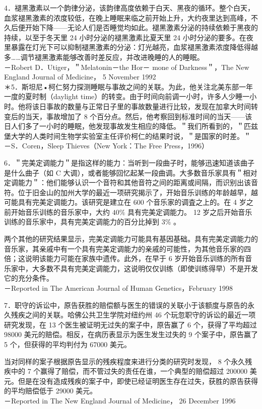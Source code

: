4．褪黑激素以一个韵律分泌，该韵律高度依赖于白天、黑夜的循环。整个白天，血浆褪黑激素的浓度较低，在晚上睡眠来临之前开始上升，大约夜里达到高峰，不久后便开始下降——无论人们是否睡觉均如此。褪黑激素分泌的持续依赖于黑夜的持续，以至于冬天里 24 小时分泌的褪黑激素比夏天里 24 小时分泌的要多。在夜里暴露在灯光下可以抑制褪黑激素的分泌：灯光越亮，血浆褪黑激素浓度降低得越多……调节褪黑激素能够改善时差反应，并改进晚睡的人的睡眠。\\
－Robert D．Utiger，＂Melatonin－the Hor－ mone of Darkness＂，The New England Journal of Medicine， 5 November 1992\\
＊5．斯坦尼•柯仁努力探测睡眠与事故之间的关联。为此，他关注北美东部一年一度的夏时制（daylight time）的转变。由于时间向前调一小时，许多人少睡一小时。他将该日事故的数量与正常日子里的事故数量进行比较，发现在加拿大时间转变后的当天，事故增加了 8 个百分点。然后，他考察回到标准时间的当天——该日人们多了一小时的睡眠，他发现事故发生相应的降低。＂我们所看到的，＂匹兹堡大学的人类时间生物学实验室主任评价柯仁的结果时说，＂是国家的时差。＂\\
－S．Coren，Sleep Thieves（New York：The Free Press，1996）

6．＂完美定调能力＂是指这样的能力：当听到一段曲子时，能够迅速知道该曲子是什么曲子（如 C 大调），或者能够回忆起某一段曲调。大多数音乐家具有＂相对定调能力＂：他们能够认识一个音符和其他音符之间的距离或间隔，而识别出该音符。位于旧金山的加州大学的最近一项研究揭示了，开始音乐训练的年龄越早，越可能具有完美定调能力。该研究是建立在 600 个音乐家的调査之上的。在 4 岁之前开始音乐训练的音乐家中，大约 $40 \%$ 具有完美定调能力。 12 岁之后开始音乐训练的音乐家中，具有完美定调能力的百分比掉到 $3 \%$ 。

两个其他的研究结果显示，完美定调能力可能具有基因基础。具有完美定调能力的音乐家，其亲戚中有一个具有完美定调能力的亲戚的可能性，为其他音乐家的四倍；这说明该能力可能在家族中遗传。此外，在早于 6 岁开始音乐训练的所有音乐家中，大多数不具有完美定调能力，这说明仅仅训练（即使训练得早）不是开发它的充分条件。\\
－Reported in The American Journal of Human Genetics，February 1998

7．职守的诉讼中，原告获胜的赔偿额与医生的错误的关联小于该额度与原告的永久残疾之间的关联。哈佛公共卫生学院对纽约州 46 个玩忽职守的诉讼的最近一项研究发现，在 13 个医生被证明无过失的案子中，原告赢了 6 个，获得了平均超过 98000 美元的赔偿。相反，在病历表显示为医生发生过失的 9 个案子中，原告赢了 5 个，但获得的平均判付为 67000 美元。

当对同样的案子根据原告显示的残疾程度来进行分类的研究时发现， 8 个永久残疾中的 7 个赢得了赔偿，而不管过失的责任在谁，一个典型的赔偿超过 200000 美元。但是在没有造成残疾的案子中，即使已经证明医生存在过失，获胜的原告获得的平均赔偿低于 29000 美元。\\
－Reported in The New England Journal of Medicine， 26 December 1996

